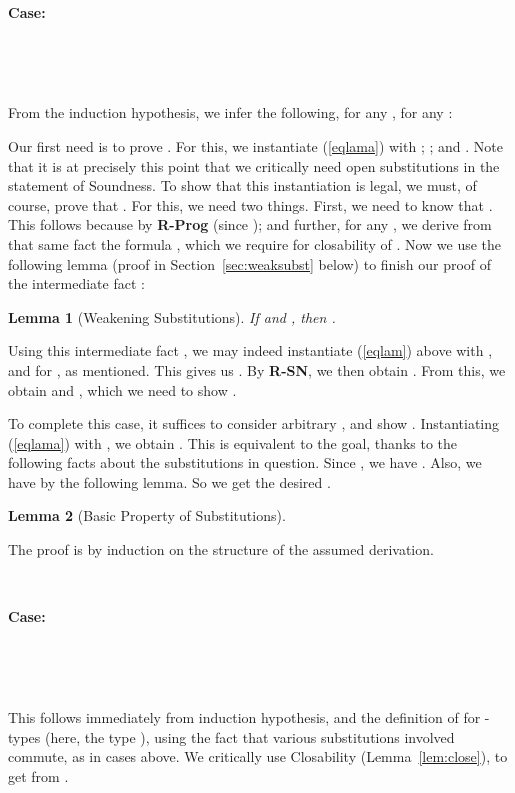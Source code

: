 \documentclass[copyright]{eptcs}
\newtheorem{lemma}{Lemma}
\begin{document}
\ 

\noindent \textbf{Case:}

\



\ 

\noindent From the
induction hypothesis, we infer the following, for any
, for any
:


\noindent Our first need is to prove .  For this, we
instantiate (\ref{eqlama}) with ;
; and .  Note that it is at
precisely this point that we critically need open substitutions in the
statement of Soundness.  To show that this instantiation is legal, we
must, of course, prove that .
For this, we need two things.  First, we need to know that
.  This follows
because  by
\textbf{R-Prog} (since ); and further, for any
, we derive from that same
fact the formula , which we
require for closability of .  Now we use the following lemma (proof
in Section~\ref{sec:weaksubst} below) to finish our proof of the
intermediate fact :

\begin{lemma}[Weakening Substitutions]
\label{lem:weaksubst}
If  and
, then
.
\end{lemma}

\noindent Using this intermediate fact
, we may indeed
instantiate (\ref{eqlam}) above with ,  and  for
, as mentioned.  This gives us . By \textbf{R-SN}, we then obtain .  From this, we obtain
 and , which we need to show .

To complete this case, it suffices to consider arbitrary
, and show .  Instantiating (\ref{eqlama})
with , we obtain .  This is equivalent to the
goal, thanks to the following facts about the substitutions in
question.  Since , we have .  Also, we have  by the
following lemma.  So we get the desired .

\begin{lemma}[Basic Property of Substitutions]
\label{lem:substvars}

\end{lemma}
\noindent The proof is by induction on the structure of the assumed
derivation.

\ 

\noindent \textbf{Case:}

\



\ 

\noindent This follows immediately from induction hypothesis, and the
definition of  for -types (here, the type
), using the fact that various
substitutions involved commute, as in cases above.  We critically use
Closability (Lemma~\ref{lem:close}), to get  from .
\end{document}
